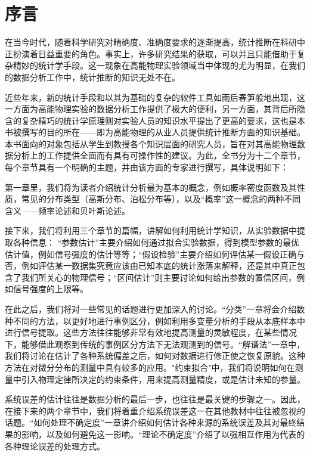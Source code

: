 \chapter{序言}
\label{Preface}

在当今时代，随着科学研究对精确度、准确度要求的逐渐提高，统计推断在科研中正扮演着日益重要的角色。事实上，许多研究结果的获取，可以并且只能借助于复杂精妙的统计学手段。这一现象在高能物理实验领域当中体现的尤为明显，在我们的数据分析工作中，统计推断的知识无处不在。

近些年来，新的统计手段和以其为基础的复杂的软件工具如雨后春笋般地出现，这一方面为高能物理实验的数据分析工作提供了极大的便利，另一方面，其背后所隐含的复杂精巧的统计学原理则对实验人员的知识水平提出了更高的要求，这也是本书被撰写的目的所在——即为高能物理的从业人员提供统计推断方面的知识基础。本书面向的对象包括从学生到教授各个知识层面的研究人员，旨在对其高能物理数据分析上的工作提供全面而有具有可操作性的建议。为此，全书分为十二个章节，每个章节具有一个明确的主题，并由该方面的专家进行撰写，具体说明如下：

第一章里，我们将为读者介绍统计分析最为基本的概念，例如概率密度函数及其性质，常见的分布类型（高斯分布、泊松分布等），以及“概率”这一概念的两种不同含义——频率论述和贝叶斯论述。

接下来，我们将利用三个章节的篇幅，讲解如何利用统计学知识，从实验数据中提取各种信息： “参数估计”主要介绍如何通过拟合实验数据，得到模型参数的最优估计值，例如信号强度的估计等等；“假设检验”主要介绍如何评估某一假设正确与否，例如评估某一数据集究竟应该由已知本底的统计涨落来解释，还是其中真正包含了我们所关心的物理信号；“区间估计”则主要讨论如何给出参数的置信区间，例如信号强度的上限等。

在此之后，我们将对一些常见的话题进行更加深入的讨论。“分类”一章将会介绍数种不同的方法，以更好地进行事例区分，例如利用多变量分析的手段从本底样本中进行信号提取。这些方法往往能够非常有效地提高测量的灵敏程度，在某些情况下，能够借此观察到传统的事例区分方法下无法观测到的信号。“解谱法”一章中，我们将讨论在估计了各种系统偏差之后，如何对数据进行修正使之恢复原貌。这种方法在对微分分布的测量中具有较多的应用。"约束拟合"中，我们将说明如何在测量中引入物理定律所决定的约束条件，用来提高测量精度，或是估计未知的参量。

系统误差的估计往往是数据分析的最后一步，也往往是最关键的步骤之一。因此，在接下来的两个章节中，我们将着重介绍系统误差这一在其他教材中往往被忽视的话题。“如何处理不确定度”一章讲介绍如何估计各种来源的系统误差及其对最终结果的影响，以及如何避免这一影响。“理论不确定度”介绍了以强相互作用为代表的各种理论误差的处理方式。

